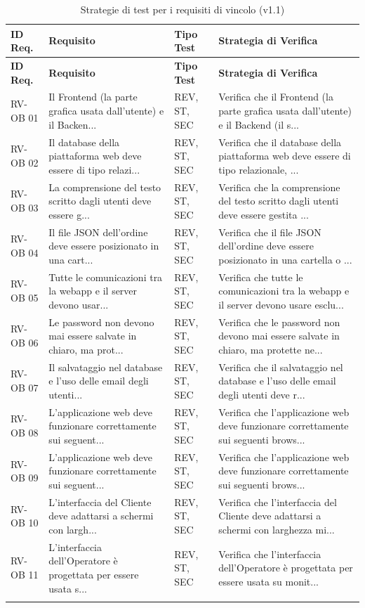 \documentclass[a4paper,11pt,oneside]{scrartcl}
\begin{document}
\begin{longtable}{|p{1.5cm}|p{5.5cm}|p{1.8cm}|p{5cm}|}
\hline
\textbf{ID Req.} & \textbf{Requisito} & \textbf{Tipo Test} & \textbf{Strategia di Verifica} \\
\hline
\endfirsthead
\hline
\textbf{ID Req.} & \textbf{Requisito} & \textbf{Tipo Test} & \textbf{Strategia di Verifica} \\
\hline
\endhead

RV-OB 01 & Il Frontend (la parte grafica usata dall'utente) e il Backen... & REV, ST, SEC & Verifica che il Frontend (la parte grafica usata dall'utente) e il Backend (il s... \\ \hline
RV-OB 02 & Il database della piattaforma web deve essere di tipo relazi... & REV, ST, SEC & Verifica che il database della piattaforma web deve essere di tipo relazionale, ... \\ \hline
RV-OB 03 & La comprensione del testo scritto dagli utenti deve essere g... & REV, ST, SEC & Verifica che la comprensione del testo scritto dagli utenti deve essere gestita ... \\ \hline
RV-OB 04 & Il file JSON dell'ordine deve essere posizionato in una cart... & REV, ST, SEC & Verifica che il file JSON dell'ordine deve essere posizionato in una cartella o ... \\ \hline
RV-OB 05 & Tutte le comunicazioni tra la webapp e il server devono usar... & REV, ST, SEC & Verifica che tutte le comunicazioni tra la webapp e il server devono usare esclu... \\ \hline
RV-OB 06 & Le password non devono mai essere salvate in chiaro, ma prot... & REV, ST, SEC & Verifica che le password non devono mai essere salvate in chiaro, ma protette ne... \\ \hline
RV-OB 07 & Il salvataggio nel database e l'uso delle email degli utenti... & REV, ST, SEC & Verifica che il salvataggio nel database e l'uso delle email degli utenti deve r... \\ \hline
RV-OB 08 & L'applicazione web deve funzionare correttamente sui seguent... & REV, ST, SEC & Verifica che l'applicazione web deve funzionare correttamente sui seguenti brows... \\ \hline
RV-OB 09 & L'applicazione web deve funzionare correttamente sui seguent... & REV, ST, SEC & Verifica che l'applicazione web deve funzionare correttamente sui seguenti brows... \\ \hline
RV-OB 10 & L'interfaccia del Cliente deve adattarsi a schermi con largh... & REV, ST, SEC & Verifica che l'interfaccia del Cliente deve adattarsi a schermi con larghezza mi... \\ \hline
RV-OB 11 & L'interfaccia dell'Operatore è progettata per essere usata s... & REV, ST, SEC & Verifica che l'interfaccia dell'Operatore è progettata per essere usata su monit... \\ \hline
\caption{Strategie di test per i requisiti di vincolo (v1.1)}
\end{longtable}
\end{document}
